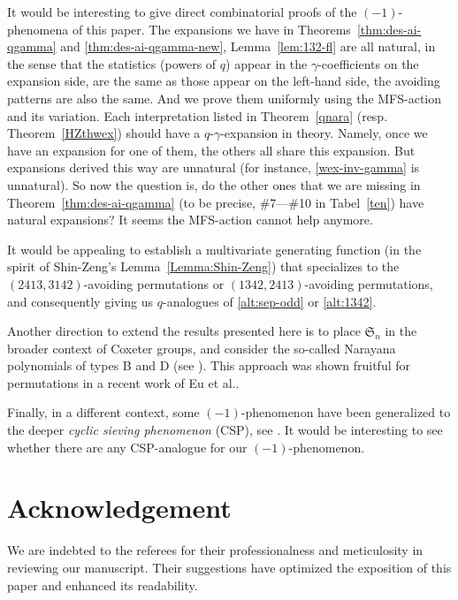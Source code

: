 \documentclass[12pt,reqno]{amsart}
\numberwithin{equation}{section}
\theoremstyle{plain}
\theoremstyle{definition}
\def\S{\mathfrak{S}}
\begin{document}
It would be interesting to give direct combinatorial proofs of the $(-1)$-phenomena of this paper. The expansions we have in Theorems~\ref{thm:des-ai-qgamma} and \ref{thm:des-ai-qgamma-new}, Lemma~\ref{lem:132-fl} are all natural, in the sense that the statistics (powers of $q$) appear in the $\gamma$-coefficients on the expansion side, are the same as those appear on the left-hand side, the avoiding patterns are also the same. And we prove them uniformly using the MFS-action and its variation. Each interpretation listed in Theorem~\ref{qnara} (resp. Theorem~\ref{HZthwex}) should have a $q$-$\gamma$-expansion in theory. Namely, once we have an expansion for one of them, the others all share this expansion. But expansions derived this way are unnatural (for instance, \eqref{wex-inv-gamma} is unnatural).  So now the question is, do the other ones that we are missing in Theorem~\ref{thm:des-ai-qgamma} (to be precise, \#7---\#10 in Tabel~\ref{ten}) have natural expansions? It seems the MFS-action cannot help anymore.









It would be appealing to establish a multivariate generating function (in the spirit of Shin-Zeng's Lemma~\ref{Lemma:Shin-Zeng}) that specializes to the $(2413, 3142)$-avoiding permutations or $(1342, 2413)$-avoiding permutations, and consequently giving us $q$-analogues of \eqref{alt:sep-odd} or \eqref{alt:1342}.




Another direction to extend the results presented here is to place $\S_n$ in the broader context of Coxeter groups, and consider the so-called  Narayana polynomials of types B and D (see \cite[Theorems 2.32 and 2.33]{Ath}). This approach was shown fruitful for permutations in a recent work of Eu et al.\cite{EFHL}.

Finally, in a different context,
 some $(-1)$-phenomenon have been generalized to the deeper \emph{cyclic sieving phenomenon} (CSP), see \cite{RSW, Sag}.
It would be interesting to see whether there are any
CSP-analogue for our $(-1)$-phenomenon.

\section*{Acknowledgement}
We are indebted to the referees for their professionalness and meticulosity in reviewing our manuscript. Their suggestions have optimized the exposition of this paper and enhanced its readability.
\end{document}
